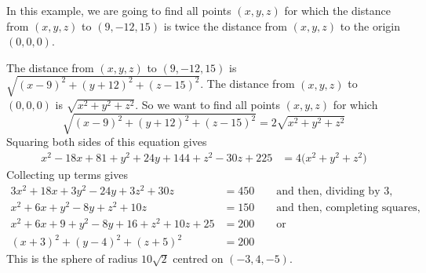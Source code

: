 \begin{eg}
In this example, we are going to find all points $(x,y,z)$ for which
the distance from $(x,y,z)$ to $(9,-12,15)$ is twice the distance from $(x,y,z)$   to the origin $(0,0,0)$.

The distance from $(x,y,z)$ to $(9,-12,15)$ is 
$\sqrt{(x-9)^2+(y+12)^2+(z-15)^2}$.
The distance from $(x,y,z)$ to $(0,0,0)$ is 
$\sqrt{x^2+y^2+z^2}$. So we want to find all points $(x,y,z)$ for which
\begin{equation*}
\sqrt{(x-9)^2+(y+12)^2+(z-15)^2}
=2\sqrt{x^2+y^2+z^2}
\end{equation*}
Squaring both sides of this equation gives
\begin{align*}
x^2-18x+81 +y^2+24y+144 +z^2-30z+225 &= 4\big(x^2+y^2+z^2)
\end{align*}
Collecting up terms gives
\begin{align*}
3x^2+18x +3y^2-24y +3z^2+30z &= 450\qquad\text{and then, dividing by $3$,} \\
x^2+6x +y^2-8y +z^2+10z &= 150\qquad\text{and then, completing squares,} \\
x^2+6x +9 +y^2-8y +16  +z^2+10z +25 &= 200\qquad\text{or}\\
(x+3)^2+(y-4)^2+(z+5)^2 &=200 
\end{align*}
This is the sphere of radius $10\sqrt{2}$ centred on $(-3,4,-5)$.
\end{eg}

